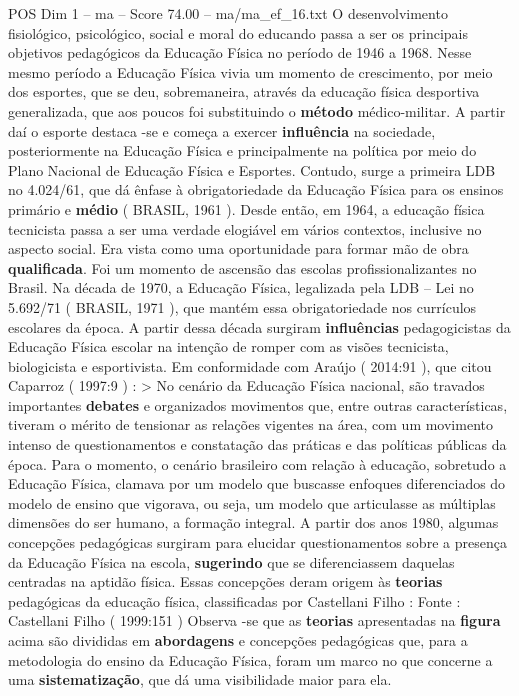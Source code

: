 \begin{textsample}{POS Dim 1 – ma – Score 74.00 – ma/ma\_ef\_16.txt}
O desenvolvimento fisiológico, psicológico, social e moral do educando passa a ser os principais objetivos pedagógicos da Educação Física no período de 1946 a 1968.
Nesse mesmo período a Educação Física vivia um momento de crescimento, por meio dos esportes, que se deu, sobremaneira, através da educação física desportiva generalizada, que aos poucos foi substituindo o \textbf{método} médico-militar.
A partir daí o esporte destaca -se e começa a exercer \textbf{influência} na sociedade, posteriormente na Educação Física e principalmente na política por meio do Plano Nacional de Educação Física e Esportes.
Contudo, surge a primeira LDB no 4.024/61, que dá ênfase à obrigatoriedade da Educação Física para os ensinos primário e \textbf{médio} ( BRASIL, 1961 ).
Desde então, em 1964, a educação física tecnicista passa a ser uma verdade elogiável em vários contextos, inclusive no aspecto social.
Era vista como uma oportunidade para formar mão de obra \textbf{qualificada}.
Foi um momento de ascensão das escolas profissionalizantes no Brasil.
Na década de 1970, a Educação Física, legalizada pela LDB – Lei no 5.692/71 ( BRASIL, 1971 ), que mantém essa obrigatoriedade nos currículos escolares da época.
A partir dessa década surgiram \textbf{influências} pedagogicistas da Educação Física escolar na intenção de romper com as visões tecnicista, biologicista e esportivista.
Em conformidade com Araújo ( 2014:91 ), que citou Caparroz ( 1997:9 ) : > No cenário da Educação Física nacional, são travados importantes \textbf{debates} e organizados movimentos que, entre outras características, tiveram o mérito de tensionar as relações vigentes na área, com um movimento intenso de questionamentos e constatação das práticas e das políticas públicas da época.
Para o momento, o cenário brasileiro com relação à educação, sobretudo a Educação Física, clamava por um modelo que buscasse enfoques diferenciados do modelo de ensino que vigorava, ou seja, um modelo que articulasse as múltiplas dimensões do ser humano, a formação integral.
A partir dos anos 1980, algumas concepções pedagógicas surgiram para elucidar questionamentos sobre a presença da Educação Física na escola, \textbf{sugerindo} que se diferenciassem daquelas centradas na aptidão física.
Essas concepções deram origem às \textbf{teorias} pedagógicas da educação física, classificadas por Castellani Filho : Fonte : Castellani Filho ( 1999:151 ) Observa -se que as \textbf{teorias} apresentadas na \textbf{figura} acima são divididas em \textbf{abordagens} e concepções pedagógicas que, para a metodologia do ensino da Educação Física, foram um marco no que concerne a uma \textbf{sistematização}, que dá uma visibilidade maior para ela.

\end{textsample}
